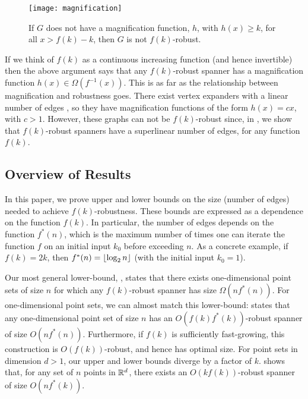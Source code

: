 \documentclass{patmorin}
\begin{document}
\begin{figure}
  \begin{center}
    \texttt{[image: magnification]}
  \end{center}
  \caption{If $G$ does not have a magnification function, $h$, with
  $h(x)\ge k$, for all $x> f(k)-k$, then $G$ is not $f(k)$-robust.}
\end{figure}

If we think of $f(k)$ as a continuous increasing function (and hence
invertible) then the above argument says that any $f(k)$-robust spanner
has a magnification function $h(x) \in \Omega(f^{-1}(x))$.  This is
as far as the relationship between magnification and robustness goes.
There exist vertex expanders with a linear number of edges \cite{hlw06},
so they have magnification functions of the form $h(x)=cx$, with
$c>1$.  However, these graphs can not be $f(k)$-robust since, in
, we show that $f(k)$-robust spanners
have a superlinear number of edges, for any function $f(k)$.


\subsection{Overview of Results}

In this paper, we prove upper and lower bounds on the size (number of
edges) needed to achieve $f(k)$-robustness.
These bounds are expressed as a dependence on the function $f(k)$.
In particular, the number of edges depends on the function $f^*(n)$,
which is the maximum number of times one can iterate the function $f$ on
an initial input $k_0$ before exceeding $n$.  As a concrete example, if
$f(k)=2k$, then  $f^*(n)={\lfloor \log_2 n \rfloor}$ (with the initial input $k_0=1$).

Our most general lower-bound, ,
states that there exists one-dimensional point sets of size $n$
for which any $f(k)$-robust spanner has size $\Omega(nf^*(n))$.
For one-dimensional point sets, we can almost match this lower-bound:
 states that any one-dimensional point set of
size $n$ has an $O(f(k)f^*(k))$-robust spanner of size $O(nf^*(n))$.
Furthermore, if $f(k)$ is sufficiently fast-growing, this construction
is $O(f(k))$-robust, and hence has optimal size.  For point sets in
dimension $d>1$, our upper and lower bounds diverge by a factor of $k$.
 shows that, for any set of $n$ points in $\mathbb{R}^d$, there exists
an $O(kf(k))$-robust spanner of size $O(nf^*(k))$.
\end{document}
